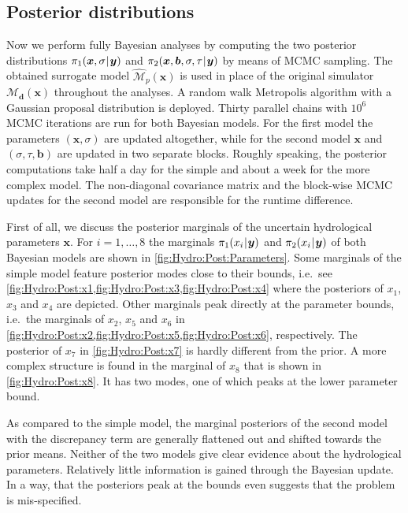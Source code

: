 \subsection{Posterior distributions}
Now we perform fully Bayesian analyses by computing the two posterior distributions \(\pi_1(\bm{x},\sigma {\:\!}|{\:\!} \bm{y})\)
and \(\pi_2(\bm{x},\bm{b},\sigma,\tau {\:\!}|{\:\!} \bm{y})\) by means of MCMC sampling.
The obtained surrogate model \(\hat{\mathcal{M}}_p(\bm{x})\) is used in place of the original simulator \(\mathcal{M}_{\bm{d}}(\bm{x})\) throughout the analyses.
A random walk Metropolis algorithm with a Gaussian proposal distribution is deployed.
Thirty parallel chains with \(10^6\) MCMC iterations are run for both Bayesian models.
For the first model the parameters \((\bm{x},\sigma)\) are updated altogether, while for the second model \(\bm{x}\) and \((\sigma,\tau,\bm{b})\) are updated in two separate blocks.
Roughly speaking, the posterior computations take half a day for the simple and about a week for the more complex model.
The non-diagonal covariance matrix and the block-wise MCMC updates for the second model are responsible for the runtime difference.
\par %
First of all, we discuss the posterior marginals of the uncertain hydrological parameters \(\bm{x}\).
For \(i=1,\ldots,8\) the marginals \(\pi_1(x_i {\:\!}|{\:\!} \bm{y})\) and \(\pi_2(x_i {\:\!}|{\:\!} \bm{y})\) of both Bayesian models are shown in \cref{fig:Hydro:Post:Parameters}.
Some marginals of the simple model feature posterior modes close to their bounds,
i.e.\ see \cref{fig:Hydro:Post:x1,fig:Hydro:Post:x3,fig:Hydro:Post:x4} where the posteriors of \(x_1\), \(x_3\)  and \(x_4\) are depicted.
Other marginals peak directly at the parameter bounds,
i.e.\ the marginals of \(x_2\), \(x_5\) and \(x_6\) in \cref{fig:Hydro:Post:x2,fig:Hydro:Post:x5,fig:Hydro:Post:x6}, respectively.
The posterior of \(x_7\) in \cref{fig:Hydro:Post:x7} is hardly different from the prior.
A more complex structure is found in the marginal of \(x_8\) that is shown in \cref{fig:Hydro:Post:x8}.
It has two modes, one of which peaks at the lower parameter bound.
\par %
As compared to the simple model, the marginal posteriors of the second model with the discrepancy term are generally flattened out and shifted towards the prior means.
Neither of the two models give clear evidence about the hydrological parameters.
Relatively little information is gained through the Bayesian update.
In a way, that the posteriors peak at the bounds even suggests that the problem is mis-specified.
